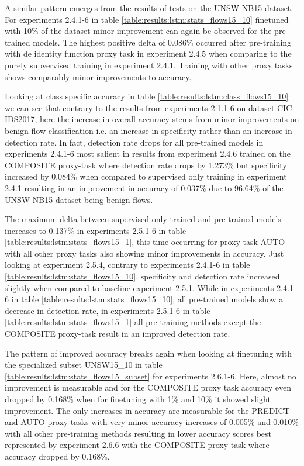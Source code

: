 A similar pattern emerges from the results of tests on the UNSW-NB15 dataset. For experiments 2.4.1-6 in table \ref{table:results:lstm:stats_flows15_10} finetuned with 10\% of the dataset minor improvement can again be observed for the pre-trained models. The highest positive delta of 0.086\% occurred after pre-training with de identity function proxy task in experiment 2.4.5 when comparing to the purely supvervised training in experiment 2.4.1. Training with other proxy tasks shows comparably minor improvements to accuracy. \par
Looking at class specific accuracy in table \ref{table:results:lstm:class_flows15_10} we can see that contrary to the results from experiments 2.1.1-6 on dataset CIC-IDS2017, here the increase in overall accuracy stems from minor improvements on benign flow classification i.e. an increase in specificity rather than an increase in detection rate. In fact, detection rate drops for all pre-trained models in experiments 2.4.1-6 most salient in results from experiment 2.4.6 trained on the COMPOSITE proxy-task where detection rate drops by 1.273\% but specificity increased by 0.084\% when compared to supervised only training in experiment 2.4.1 resulting in an improvement in accuracy of 0.037\% due to 96.64\% of the UNSW-NB15 dataset being benign flows. \par
The maximum delta between supervised only trained and pre-trained models increases to 0.137\% in experiments 2.5.1-6 in table \ref{table:results:lstm:stats_flows15_1}, this time occurring for proxy task AUTO with all other proxy tasks also showing minor improvements in accuracy. Just looking at experiment 2.5.4, contrary to experiments 2.4.1-6 in table  \ref{table:results:lstm:stats_flows15_10}, specificity and detection rate increased slightly when compared to baseline experiment 2.5.1. While in experiments 2.4.1-6 in table \ref{table:results:lstm:stats_flows15_10}, all pre-trained models show a decrease in detection rate, in experiments 2.5.1-6 in table  \ref{table:results:lstm:stats_flows15_1} all pre-training methods except the COMPOSITE proxy-task result in an improved detection rate. \par
The pattern of improved accuracy breaks again when looking at finetuning with the specialized subset UNSW15\_10 in table \ref{table:results:lstm:stats_flows15_subset} for experiments 2.6.1-6. Here, almost no improvement is measurable and for the COMPOSITE proxy task accuracy even dropped by 0.168\% when for finetuning with 1\% and 10\% it showed slight improvement. The only increases in accuracy are measurable for the PREDICT and AUTO proxy tasks with very minor accuracy increases of 0.005\% and 0.010\% with all other pre-training methods resulting in lower accuracy scores best represented by experiment 2.6.6 with the COMPOSITE proxy-task where accuracy dropped by 0.168\%. \par
